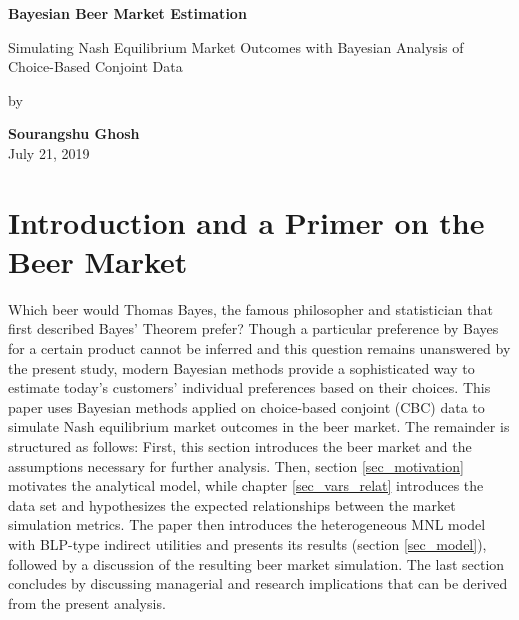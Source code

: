 \documentclass[12pt,a4paper]{article}
\begin{document}
\begin{center}

 {\Large{\bf Bayesian Beer Market Estimation}} \medskip

  {\Large{Simulating Nash Equilibrium Market Outcomes with Bayesian Analysis of Choice-Based Conjoint Data}} \vspace{3cm}  
 
  by \medskip

  \textbf{Sourangshu Ghosh} \\
  
  July 21, 2019
  
\end{center}


\pagebreak
\pagestyle{plain}
\tableofcontents
\pagebreak
\listoffigures
\listoftables
\renewcommand\lstlistlistingname{List of R Code Chunks}
\lstlistoflistings
\newpage
\setcounter{page}{2}
\setlength{\baselineskip}{1.5\baselineskip}
\pagestyle{plain}


\section{Introduction and a Primer on the Beer Market} \label{sec_intro}
Which beer would Thomas Bayes, the famous philosopher and statistician that first described Bayes' Theorem \citep{bayesEssaySolvingProblem1763} prefer?
Though a particular preference by Bayes for a certain product cannot be inferred and this question remains unanswered by the present study, modern Bayesian methods provide a sophisticated way to estimate today's customers' individual preferences based on their choices.
This paper uses Bayesian methods applied on choice-based conjoint (CBC) data to simulate Nash equilibrium market outcomes in the beer market.
The remainder is structured as follows: First, this section introduces the beer market and the assumptions necessary for further analysis.
Then, section \ref{sec_motivation} motivates the analytical model, while chapter \ref{sec_vars_relat} introduces the data set and hypothesizes the expected relationships between the market simulation metrics.
The paper then introduces the heterogeneous MNL model with BLP-type indirect utilities and presents its results (section \ref{sec_model}), followed by a discussion of the resulting beer market simulation.
The last section concludes by discussing managerial and research implications that can be derived from the present analysis.
\end{document}
